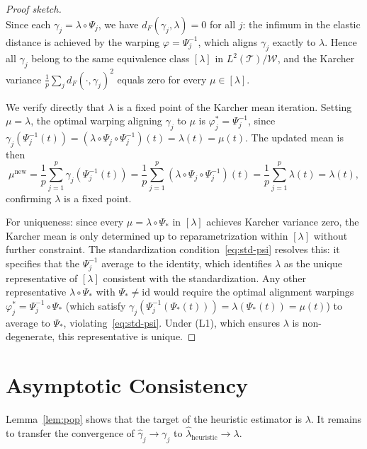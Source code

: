 \documentclass[11pt]{article}
\theoremstyle{definition}
\newcommand{\T}{\mathcal{T}}
\newcommand{\W}{\mathcal{W}}
\newcommand{\lhat}{\hat{\lambda}}
\newcommand{\ghat}{\hat{\gamma}}
\newcommand{\id}{\mathrm{id}}
\begin{document}
\begin{proof}[Proof sketch]
	~\\
  Since each $\gamma_j = \lambda \circ \Psi_j$, we have $d_F(\gamma_j, \lambda) = 0$
  for all $j$: the infimum in the elastic distance is achieved by the warping
  $\varphi = \Psi_j^{-1}$, which aligns $\gamma_j$ exactly to $\lambda$.
  Hence all $\gamma_j$ belong to the same equivalence class $[\lambda]$ in
  $L^2(\T)/\W$, and the Karcher variance $\frac{1}{p}\sum_j d_F(\cdot,\gamma_j)^2$
  equals zero for every $\mu \in [\lambda]$.

  We verify directly that $\lambda$ is a fixed point of the Karcher mean
  iteration. Setting $\mu = \lambda$, the optimal warping aligning $\gamma_j$
  to $\mu$ is $\varphi_j^* = \Psi_j^{-1}$, since
  $\gamma_j(\Psi_j^{-1}(t)) = (\lambda \circ \Psi_j \circ \Psi_j^{-1})(t)
  = \lambda(t) = \mu(t)$.
  The updated mean is then
  \[
    \mu^{\mathrm{new}}
    = \frac{1}{p}\sum_{j=1}^p \gamma_j(\Psi_j^{-1}(t))
    = \frac{1}{p}\sum_{j=1}^p (\lambda \circ \Psi_j \circ \Psi_j^{-1})(t)
    = \frac{1}{p}\sum_{j=1}^p \lambda(t) = \lambda(t),
  \]
  confirming $\lambda$ is a fixed point.

  For uniqueness: since every $\mu = \lambda \circ \Psi_*$ in $[\lambda]$
  achieves Karcher variance zero, the Karcher mean is only determined up to
  reparametrization within $[\lambda]$ without further constraint.
  The standardization condition~\eqref{eq:std-psi} resolves this: it specifies
  that the $\Psi_j^{-1}$ average to the identity, which identifies $\lambda$
  as the unique representative of $[\lambda]$ consistent with the
  standardization. Any other representative $\lambda \circ \Psi_*$ with
  $\Psi_* \neq \id$ would require the optimal alignment warpings
  $\varphi_j^* = \Psi_j^{-1} \circ \Psi_*$ (which satisfy
  $\gamma_j(\Psi_j^{-1}(\Psi_*(t))) = \lambda(\Psi_*(t)) = \mu(t)$) to
  average to $\Psi_*$, violating~\eqref{eq:std-psi}. Under (L1), which
  ensures $\lambda$ is non-degenerate, this representative is unique.
\end{proof}

\section*{Asymptotic Consistency}

Lemma~\ref{lem:pop} shows that the target of the heuristic estimator is $\lambda$.
It remains to transfer the convergence of $\ghat_j \to \gamma_j$ to
$\lhat_{\mathrm{heuristic}} \to \lambda$.
\end{document}
